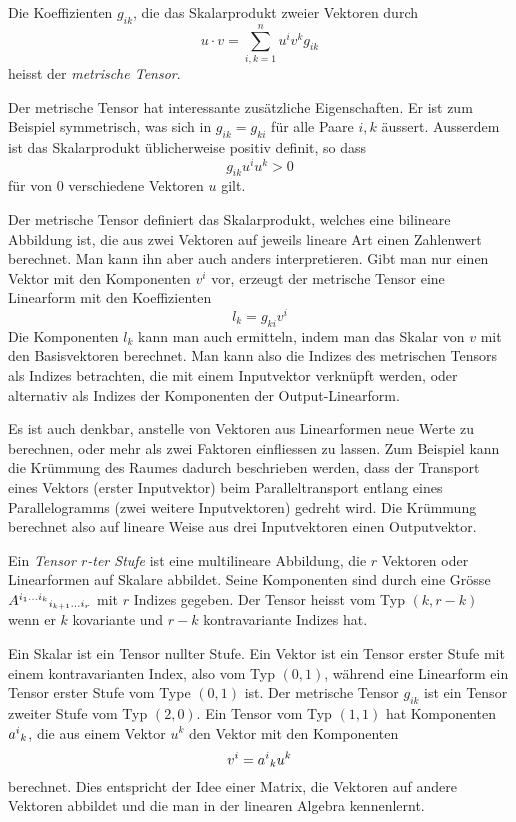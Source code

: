 \begin{definition}
Die Koeffizienten $g_{ik}$, die das Skalarprodukt zweier Vektoren durch
\[
u\cdot v
=
\sum_{i,k=1}^n u^iv^k g_{ik}
\]
heisst der {\em metrische Tensor}.
%
\end{definition}

Der metrische Tensor hat interessante zusätzliche Eigenschaften.
Er ist zum Beispiel symmetrisch, was sich in $g_{ik}=g_{ki}$ für
alle Paare $i,k$ äussert.
Ausserdem ist das Skalarprodukt üblicherweise positiv definit,
so dass 
\[
g_{ik}u^i u^k
>
0
\]
für von $0$ verschiedene Vektoren $u$ gilt.

Der metrische Tensor definiert das Skalarprodukt, welches eine bilineare
Abbildung ist, die aus zwei Vektoren auf jeweils lineare Art einen
Zahlenwert berechnet.
Man kann ihn aber auch anders interpretieren.
Gibt man nur einen Vektor mit den Komponenten $v^i$ vor, erzeugt der
metrische Tensor eine Linearform mit den Koeffizienten
\[
l_k = g_{ki}v^i
\]
Die Komponenten $l_k$ kann man auch ermitteln, indem man das Skalar
von $v$ mit den Basisvektoren berechnet.
Man kann also die Indizes des metrischen Tensors als Indizes betrachten,
die mit einem Inputvektor verknüpft werden, oder alternativ als Indizes
der Komponenten der Output-Linearform.

Es ist auch denkbar, anstelle von Vektoren aus Linearformen
neue Werte zu berechnen, oder mehr als zwei Faktoren einfliessen zu
lassen.
Zum Beispiel kann die Krümmung des Raumes dadurch beschrieben werden,
dass der Transport eines Vektors (erster Inputvektor) beim Paralleltransport
entlang eines Parallelogramms (zwei weitere Inputvektoren) gedreht wird.
Die Krümmung berechnet also auf lineare Weise aus drei Inputvektoren
einen Outputvektor.

\begin{definition}[Tensor]
Ein {\em Tensor $r$-ter Stufe} ist eine multilineare Abbildung, die
$r$ Vektoren oder Linearformen auf Skalare abbildet.
Seine Komponenten sind durch eine Grösse
$A^{i_1\dots i_k}\mathstrut_{i_{k+1}\dots i_r}$
mit $r$ Indizes gegeben.
Der Tensor heisst vom Typ $(k,r-k)$ wenn er $k$ kovariante und 
$r-k$ kontravariante Indizes hat.
\end{definition}

Ein Skalar ist ein Tensor nullter Stufe.
Ein Vektor ist ein Tensor erster Stufe mit einem kontravarianten Index,
also vom Typ $(0,1)$, während eine Linearform ein Tensor erster
Stufe vom Type $(0,1)$ ist.
Der metrische Tensor $g_{ik}$ ist ein Tensor zweiter Stufe vom Typ
$(2,0)$.
Ein Tensor vom Typ $(1,1)$ hat Komponenten $a^i\mathstrut_k$, die aus
einem Vektor $u^k$ den Vektor mit den Komponenten
\[
v^i = a^i\mathstrut_k u^k
\]
berechnet.
Dies entspricht der Idee einer Matrix, die Vektoren auf andere 
Vektoren abbildet und die man in der linearen Algebra kennenlernt.


